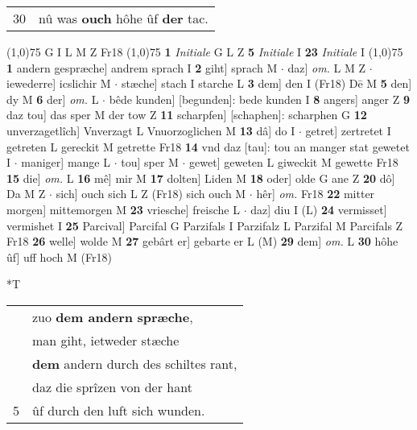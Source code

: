 \documentclass[8pt,a4paper,notitlepage]{article}
\begin{document}
\begin{table}[ht]
\begin{minipage}[t]{0.5\linewidth}
\begin{tabular}{rl}
30 & nû was \textbf{ouch} hôhe ûf \textbf{der} tac.\\ 
\end{tabular}
\scriptsize
\line(1,0){75} \newline
G I L M Z Fr18 \newline
\line(1,0){75} \newline
\textbf{1} \textit{Initiale} G L Z  \textbf{5} \textit{Initiale} I  \textbf{23} \textit{Initiale} I  \newline
\line(1,0){75} \newline
\textbf{1} andern gespræche] andrem sprach I \textbf{2} giht] sprach M  $\cdot$ daz] \textit{om.} L M Z  $\cdot$ iewederre] icslichir M  $\cdot$ stæche] stach I starche L \textbf{3} dem] den I (Fr18) Dē M \textbf{5} den] dy M \textbf{6} der] \textit{om.} L  $\cdot$ bêde kunden] [begunden]: bede kunden I \textbf{8} angers] anger Z \textbf{9} daz tou] das sper M der tow Z \textbf{11} scharpfen] [schaphen]: scharphen G \textbf{12} unverzagetlîch] Vnverzagt L Vnuorzoglichen M \textbf{13} dâ] do I  $\cdot$ getret] zertretet I getreten L gereckit M getrette Fr18 \textbf{14} vnd daz [tau]: tou an manger stat gewetet I  $\cdot$ maniger] mange L  $\cdot$ tou] sper M  $\cdot$ gewet] geweten L giweckit M gewette Fr18 \textbf{15} die] \textit{om.} L \textbf{16} mê] mir M \textbf{17} dolten] Liden M \textbf{18} oder] olde G ane Z \textbf{20} dô] Da M Z  $\cdot$ sich] ouch sich L Z (Fr18) sich ouch M  $\cdot$ hêr] \textit{om.} Fr18 \textbf{22} mitter morgen] mittemorgen M \textbf{23} vriesche] freische L  $\cdot$ daz] diu I (L) \textbf{24} vermisset] vermishet I \textbf{25} Parcival] Parcifal G Parzifals I Parzifalz L Parzifal M Parcifals Z Fr18 \textbf{26} welle] wolde M \textbf{27} gebârt er] gebarte er L (M) \textbf{29} dem] \textit{om.} L \textbf{30} hôhe ûf] uff hoch M (Fr18) \newline
\end{minipage}
\hspace{0.5cm}
\begin{minipage}[t]{0.5\linewidth}
\small
\begin{center}*T
\end{center}
\begin{tabular}{rl}
 & zuo \textbf{dem andern} \textbf{spræche},\\ 
 & man giht, ietweder stæche\\ 
 & \textbf{dem} andern durch des schiltes rant,\\ 
 & daz die sprîzen von der hant\\ 
5 & ûf durch den luft sich wunden.\\ 

\end{tabular}
\end{minipage}
\end{table}
\end{document}
